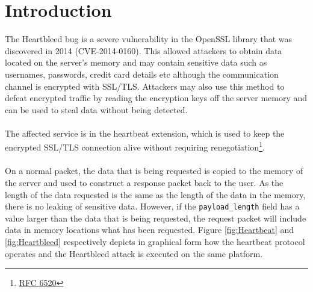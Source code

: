 \documentclass[a4paper,12pt]{article}
\begin{document}
	\section{Introduction}
	The Heartbleed bug is a severe vulnerability in the OpenSSL library that was discovered in 2014 (CVE-2014-0160). This allowed attackers to obtain data located on the server's memory and may contain sensitive data such as usernames, passwords, credit card details etc although the communication channel is encrypted with SSL/TLS. Attackers may also use this method to defeat encrypted traffic by reading the encryption keys off the server memory and can be used to steal data without being detected.\\\\The affected service is in the heartbeat extension, which is used to keep the encrypted SSL/TLS connection alive without requiring renegotiation\footnote{\hyperlink{https://tools.ietf.org/html/rfc6520}{RFC 6520}}. \\\\On a normal packet, the data that is being requested is copied to the memory of the server and used to construct a response packet back to the user. As the length of the data requested is the same as the length of the data in the memory, there is no leaking of sensitive data. However, if the \texttt{payload\_length} field has a value larger than the data that is being requested, the request packet will include data in memory locations what has been requested. Figure
\ref{fig:Heartbeat} and \ref{fig:Heartbleed} respectively depicts in graphical form how the heartbeat protocol operates and the Heartbleed attack is executed on the same platform.
\end{document}
